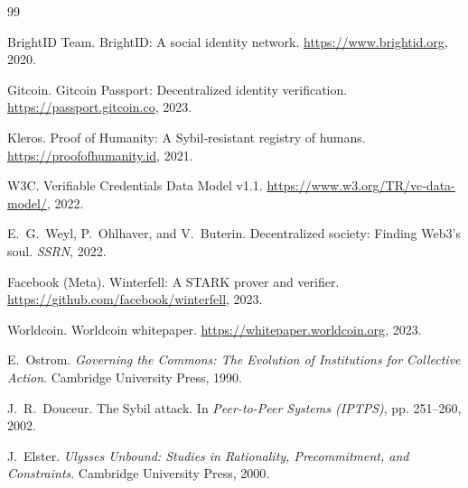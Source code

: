 \documentclass[11pt,twocolumn]{article}
\begin{document}

\begin{thebibliography}{99}

BrightID Team.
\newblock BrightID: A social identity network.
\newblock \url{https://www.brightid.org}, 2020.

Gitcoin.
\newblock Gitcoin Passport: Decentralized identity verification.
\newblock \url{https://passport.gitcoin.co}, 2023.

Kleros.
\newblock Proof of Humanity: A Sybil-resistant registry of humans.
\newblock \url{https://proofofhumanity.id}, 2021.

W3C.
\newblock Verifiable Credentials Data Model v1.1.
\newblock \url{https://www.w3.org/TR/vc-data-model/}, 2022.

E.~G.~Weyl, P.~Ohlhaver, and V.~Buterin.
\newblock Decentralized society: Finding Web3's soul.
\newblock \textit{SSRN}, 2022.

Facebook (Meta).
\newblock Winterfell: A STARK prover and verifier.
\newblock \url{https://github.com/facebook/winterfell}, 2023.

Worldcoin.
\newblock Worldcoin whitepaper.
\newblock \url{https://whitepaper.worldcoin.org}, 2023.

E.~Ostrom.
\newblock \textit{Governing the Commons: The Evolution of Institutions for Collective Action}.
\newblock Cambridge University Press, 1990.

J.~R.~Douceur.
\newblock The Sybil attack.
\newblock In \textit{Peer-to-Peer Systems (IPTPS)}, pp. 251--260, 2002.

J.~Elster.
\newblock \textit{Ulysses Unbound: Studies in Rationality, Precommitment, and Constraints}.
\newblock Cambridge University Press, 2000.

\end{thebibliography}
\end{document}

